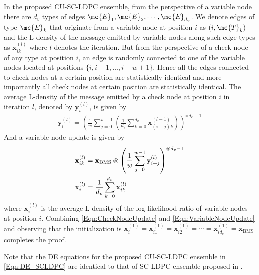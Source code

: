 \documentclass[conference]{IEEEtran}
\begin{document}
\begin{IEEEproof}
In the proposed CU-SC-LDPC ensemble, from the perspective of a variable node there are $d_{v}$ types of edges $\mc{E}_{1},\mc{E}_{2},\cdots,\mc{E}_{d_{v}}$. We denote edges of type $\mc{E}_{k}$ that originate from a variable node at position $i$ as $(i,\mc{T}_{k})$ and the L-density of the message emitted by variable nodes along such edge types as $\mathbf{x}_{ik}^{(l)}$ where
 $l$  denotes the iteration. But from the perspective of a check node of any type at position $i$, an edge is randomly
connected to one of the variable nodes located at positions $\{i, i-1,\ldots ,i-w+1\}$.	Hence all the edges connected to check nodes at a certain position are statistically identical and more importantly all check nodes at certain position are statistically identical.
The average L-density of the message emitted by a check node at position $i$ in iteration $l$, denoted by $\mathbf{y}_{i}^{(l)}$, is given by
\begin{align}
\mathbf{y}_{i}^{(l)}=\left(\frac{1}{w}\sum_{j=0}^{w-1}\left(\frac{1}{d_{v}}\sum_{k=0}^{d_{v}}\mathbf{x}_{(i-j)k}^{(l-1)}\right)\right)^{\boxast d_{c}-1}
\label{Eqn:CheckNodeUpdate}
\end{align}
And a variable node update is given by
\begin{align}
\mathbf{x}_{ik}^{(l)}&=\mathbf{x}_{\text{BMS}}\circledast \left(\frac{1}{w}\sum_{j=0}^{w-1}\mathbf{y}_{i+j}^{(l)}\right)^{\circledast d_{v}-1}\label{Eqn:VariableNodeUpdate}\\
\mathbf{x}_{i}^{(l)}&=\frac{1}{d_{v}}\sum_{k=0}^{d_{v}}\mathbf{x}_{ik}^{(l)}\notag
\end{align}
where $\mathbf{x}_{i}^{(l)}$ is the average L-density of the log-likelihood ratio of variable nodes at position $i$.
Combining \eqref{Eqn:CheckNodeUpdate} and \eqref{Eqn:VariableNodeUpdate} and observing that the initialization
is $\mathbf{x}_{i}^{(1)}=\mathbf{x}_{i1}^{(1)}=\mathbf{x}_{i2}^{(1)}=\cdots=\mathbf{x}_{id_{v}}^{(1)}=\mathbf{x}_{\text{BMS}}$ completes the proof.
\end{IEEEproof}

Note that the DE equations for the proposed CU-SC-LDPC ensemble in \eqref{Eqn:DE_SCLDPC} are identical to that of SC-LDPC ensemble proposed in \cite{KudekarUrbanke11,kudekaruniversal}.
\end{document}
